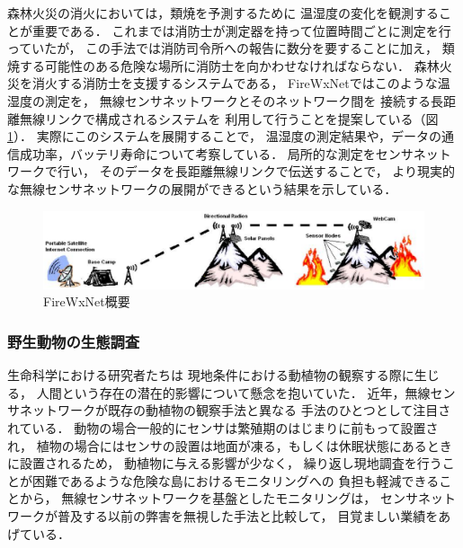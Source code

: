 森林火災の消火においては，類焼を予測するために
温湿度の変化を観測することが重要である．
これまでは消防士が測定器を持って位置時間ごとに測定を行っていたが，
この手法では消防司令所への報告に数分を要することに加え，
類焼する可能性のある危険な場所に消防士を向かわせなければならない．
森林火災を消火する消防士を支援するシステムである，
FireWxNet\cite{conf/mobisys/HartungHSH06}ではこのような温湿度の測定を，
無線センサネットワークとそのネットワーク間を
接続する長距離無線リンクで構成されるシステムを
利用して行うことを提案している（図\ref{fig:firewxnet_overview}）．
実際にこのシステムを展開することで，
温湿度の測定結果や，データの通信成功率，バッテリ寿命について考察している．
局所的な測定をセンサネットワークで行い，
そのデータを長距離無線リンクで伝送することで，
より現実的な無線センサネットワークの展開ができるという結果を示している．

\begin{figure}[htbp]
 \begin{center}
  \includegraphics[width=140mm]{./images/firewxnet_overview.eps}
 \end{center}
 \caption{FireWxNet概要}
 \label{fig:firewxnet_overview}
\end{figure}




\subsubsection{野生動物の生態調査}

\vspace{0.5em}生命科学における研究者たちは
現地条件における動植物の観察する際に生じる，
人間という存在の潜在的影響について懸念を抱いていた．
近年，無線センサネットワークが既存の動植物の観察手法と異なる
手法のひとつとして注目されている．
動物の場合一般的にセンサは繁殖期のはじまりに前もって設置され，
植物の場合にはセンサの設置は地面が凍る，もしくは休眠状態にあるときに設置されるため，
動植物に与える影響が少なく，
繰り返し現地調査を行うことが困難であるような危険な島におけるモニタリングへの
負担も軽減できることから，
無線センサネットワークを基盤としたモニタリングは，
センサネットワークが普及する以前の弊害を無視した手法と比較して，
目覚ましい業績をあげている．

